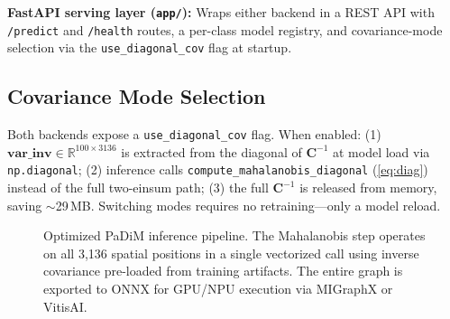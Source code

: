 \documentclass[blind]{gtac}
\begin{document}
\textbf{FastAPI serving layer (\texttt{app/}):}  Wraps either backend in a
REST API with \texttt{/predict} and \texttt{/health} routes, a per-class model
registry, and covariance-mode selection via the \texttt{use\_diagonal\_cov} flag
at startup.

\subsection{Covariance Mode Selection}

Both backends expose a \texttt{use\_diagonal\_cov} flag.  When enabled:
(1) $\mathbf{var\_inv} \in \mathbb{R}^{100\times3136}$ is extracted from the
diagonal of $\mathbf{C}^{-1}$ at model load via \texttt{np.diagonal}; (2)
inference calls \texttt{compute\_mahalanobis\_diagonal} (\ref{eq:diag}) instead
of the full two-einsum path; (3) the full $\mathbf{C}^{-1}$ is released from
memory, saving $\sim$29\,MB.  Switching modes requires no retraining---only a
model reload.

\begin{figure}[H]
\centering
{}
\caption{Optimized PaDiM inference pipeline.  The Mahalanobis step operates on
all 3{,}136 spatial positions in a single vectorized call using inverse
covariance pre-loaded from training artifacts.  The entire graph is exported
to ONNX for GPU/NPU execution via MIGraphX or VitisAI.}
\label{fig:pipeline}
\end{figure}
\end{document}
